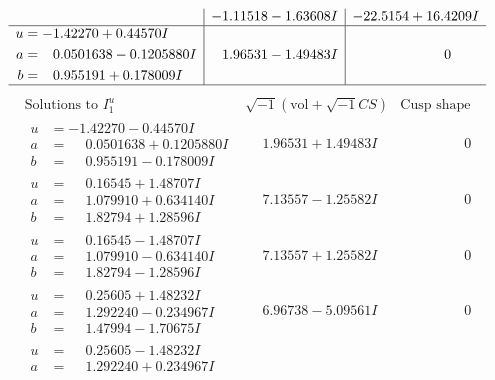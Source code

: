 \documentclass[1p]{elsarticle_modified}
\theoremstyle{definition}
\newcommand{\I}{\sqrt{-1}}
\begin{document}
$$\begin{array}{c|c|c}
 & -1.11518 - 1.63608 I & -22.5154 + 16.4209 I \\ \hline\begin{aligned}
u &= -1.42270 + 0.44570 I \\
a &= \phantom{-}0.0501638 - 0.1205880 I \\
b &= \phantom{-}0.955191 + 0.178009 I\end{aligned}
 & \phantom{-}1.96531 - 1.49483 I & \phantom{-0.000000 } 0\\
 \hline 
 \end{array}$$\newpage$$\begin{array}{c|c|c}  
\text{Solutions to }I^u_{1}& \I (\text{vol} + \sqrt{-1}CS) & \text{Cusp shape}\\
 \hline 
\begin{aligned}
u &= -1.42270 - 0.44570 I \\
a &= \phantom{-}0.0501638 + 0.1205880 I \\
b &= \phantom{-}0.955191 - 0.178009 I\end{aligned}
 & \phantom{-}1.96531 + 1.49483 I & \phantom{-0.000000 } 0 \\ \hline\begin{aligned}
u &= \phantom{-}0.16545 + 1.48707 I \\
a &= \phantom{-}1.079910 + 0.634140 I \\
b &= \phantom{-}1.82794 + 1.28596 I\end{aligned}
 & \phantom{-}7.13557 - 1.25582 I & \phantom{-0.000000 } 0 \\ \hline\begin{aligned}
u &= \phantom{-}0.16545 - 1.48707 I \\
a &= \phantom{-}1.079910 - 0.634140 I \\
b &= \phantom{-}1.82794 - 1.28596 I\end{aligned}
 & \phantom{-}7.13557 + 1.25582 I & \phantom{-0.000000 } 0 \\ \hline\begin{aligned}
u &= \phantom{-}0.25605 + 1.48232 I \\
a &= \phantom{-}1.292240 - 0.234967 I \\
b &= \phantom{-}1.47994 - 1.70675 I\end{aligned}
 & \phantom{-}6.96738 - 5.09561 I & \phantom{-0.000000 } 0 \\ \hline\begin{aligned}
u &= \phantom{-}0.25605 - 1.48232 I \\
a &= \phantom{-}1.292240 + 0.234967 I \\

\end{aligned}
\end{array}$$
\end{document}
